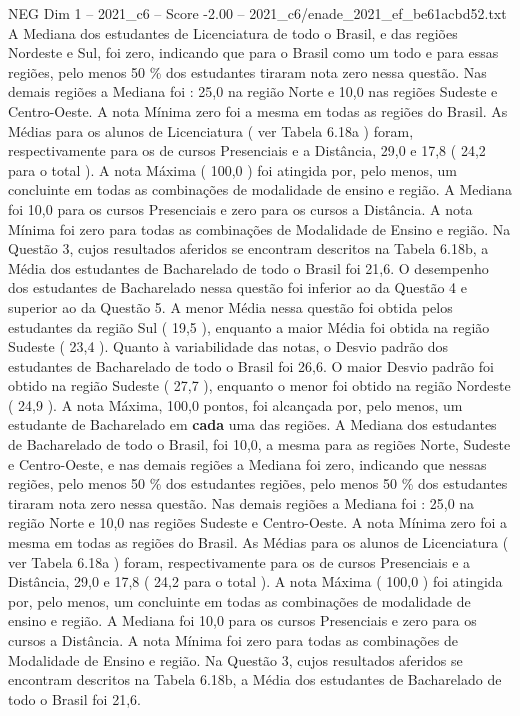 \begin{textsample}{NEG Dim 1 – 2021\_c6 – Score -2.00 – 2021\_c6/enade\_2021\_ef\_be61acbd52.txt}
A Mediana dos estudantes de Licenciatura de todo o Brasil, e das regiões Nordeste e Sul, foi zero, indicando que para o Brasil como um todo e para essas regiões, pelo menos 50 \% dos estudantes tiraram nota zero nessa questão.
Nas demais regiões a Mediana foi : 25,0 na região Norte e 10,0 nas regiões Sudeste e Centro-Oeste.
A nota Mínima zero foi a mesma em todas as regiões do Brasil.
As Médias para os alunos de Licenciatura ( ver Tabela 6.18a ) foram, respectivamente para os de cursos Presenciais e a Distância, 29,0 e 17,8 ( 24,2 para o total ).
A nota Máxima ( 100,0 ) foi atingida por, pelo menos, um concluinte em todas as combinações de modalidade de ensino e região.
A Mediana foi 10,0 para os cursos Presenciais e zero para os cursos a Distância.
A nota Mínima foi zero para todas as combinações de Modalidade de Ensino e região.
Na Questão 3, cujos resultados aferidos se encontram descritos na Tabela 6.18b, a Média dos estudantes de Bacharelado de todo o Brasil foi 21,6.
O desempenho dos estudantes de Bacharelado nessa questão foi inferior ao da Questão 4 e superior ao da Questão 5.
A menor Média nessa questão foi obtida pelos estudantes da região Sul ( 19,5 ), enquanto a maior Média foi obtida na região Sudeste ( 23,4 ).
Quanto à variabilidade das notas, o Desvio padrão dos estudantes de Bacharelado de todo o Brasil foi 26,6.
O maior Desvio padrão foi obtido na região Sudeste ( 27,7 ), enquanto o menor foi obtido na região Nordeste ( 24,9 ).
A nota Máxima, 100,0 pontos, foi alcançada por, pelo menos, um estudante de Bacharelado em \textbf{cada} uma das regiões.
A Mediana dos estudantes de Bacharelado de todo o Brasil, foi 10,0, a mesma para as regiões Norte, Sudeste e Centro-Oeste, e nas demais regiões a Mediana foi zero, indicando que nessas regiões, pelo menos 50 \% dos estudantes regiões, pelo menos 50 \% dos estudantes tiraram nota zero nessa questão.
Nas demais regiões a Mediana foi : 25,0 na região Norte e 10,0 nas regiões Sudeste e Centro-Oeste.
A nota Mínima zero foi a mesma em todas as regiões do Brasil.
As Médias para os alunos de Licenciatura ( ver Tabela 6.18a ) foram, respectivamente para os de cursos Presenciais e a Distância, 29,0 e 17,8 ( 24,2 para o total ).
A nota Máxima ( 100,0 ) foi atingida por, pelo menos, um concluinte em todas as combinações de modalidade de ensino e região.
A Mediana foi 10,0 para os cursos Presenciais e zero para os cursos a Distância.
A nota Mínima foi zero para todas as combinações de Modalidade de Ensino e região.
Na Questão 3, cujos resultados aferidos se encontram descritos na Tabela 6.18b, a Média dos estudantes de Bacharelado de todo o Brasil foi 21,6.

\end{textsample}

